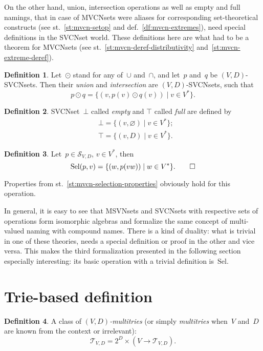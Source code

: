 \documentclass{article}
\theoremstyle{definition}
\newtheorem{Df}{Definition}
\newcommand{\setcharsvcn}{S}
\newcommand{\setcharmt}{T}
\newcommand{\setsymbol}[3]{\mathcal{#1}_{#2,#3}}
\newcommand{\setsvcn}[2]{\setsymbol{\setcharsvcn}{#1}{#2}}
\newcommand{\setmt}[2]{\setsymbol{\setcharmt}{#1}{#2}}
\newcommand{\select}{\mathrm{Sel}}
\begin{document}
On the other hand, union, intersection operations as well as empty and full
namings, that in case of MVCNsets were aliases for corresponding
set-theoretical constructs (see st.~\ref{st:mvcn-setop} and
def.~\ref{df:mvcn-extremes}), need special definitions in the SVCNset
world. These definitions here are what had to be a theorem for MVCNsets
(see st.~\ref{st:mvcn-deref-distributivity} and~\ref{st:mvcn-extreme-deref}).

\begin{Df}\label{df:svcn-setop}
Let~$\odot$ stand for any of~$\cup$ and~$\cap$, and let~$p$ and~$q$ be
$(V,D)$-SVCNsets. Then their \emph{union} and \emph{intersection} are
$(V,D)$-SVCNsets, such that
\[
  p\odot q = \{ (v, p(v) \odot q(v)) \mid v\in V^\ast \} .
\]
\end{Df}

\begin{Df}\label{df:svcn-extremes}
SVCNset~$\bot$ called \emph{empty} and $\top$ called \emph{full} are defined by
\begin{eqnarray*}
  &  \bot = \{ (v, \varnothing) \mid v\in V^\ast \} ; \\
  &  \top = \{ (v, D) \mid v\in V^\ast \} .
\end{eqnarray*}
\end{Df}

\begin{Df}\label{df:svcn-select}
Let~$p\in\setsvcn{V}{D}$, $v\in V^\ast$, then
\[
  \select(p,v) = \{ (w, p(vw)) \mid w\in V^\ast \} .\qedhere
\]
\end{Df}

Properties from st.~\ref{st:mvcn-selection-properties} obviously hold for this
operation.

In general, it is easy to see that MSVNsets and SVCNsets with respective sets
of operations form isomorphic algebras and formalize the same concept of
multi-valued naming with compound names.
There is a kind of duality: what is trivial in one of these theories, needs a
special definition or proof in the other and vice versa. This makes the third
formalization presented in the following section especially interesting: its
basic operation with a trivial definition is~$\select$.


\section{Trie-based definition}

\begin{Df}\label{df:mt}
A class of \emph{$(V,D)$-multitries} (or simply \emph{multitries} when~$V$
and~$D$ are known from the context or irrelevant):
\[
  \setmt{V}{D} = 2^D \times (V \to \setmt{V}{D}) .
\]
\end{Df}
\end{document}
